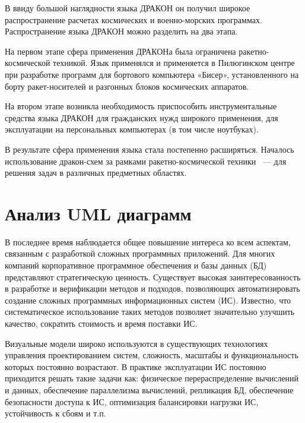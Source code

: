 В ввиду большой наглядности языка ДРАКОН он получил широкое распространение расчетах космических и военно-морских программах. Распространение языка ДРАКОН можно разделить на два этапа.

На первом этапе сфера применения ДРАКОНа была ограничена ракетно-космической техникой. Язык применялся и применяется в Пилюгинском центре при разработке программ для бортового компьютера «Бисер», установленного на борту ракет-носителей и разгонных блоков космических аппаратов.

На втором этапе возникла необходимость приспособить инструментальные средства языка ДРАКОН для гражданских нужд широкого применения, для эксплуатации на персональных компьютерах (в том числе ноутбуках).

В результате сфера применения языка стала постепенно расширяться. Началось использование дракон-схем за рамками ракетно-космической техники ~--- для решения задач в различных предметных областях.

\section{Анализ UML диаграмм}

В последнее время наблюдается общее повышение интереса ко всем аспектам, связанным с разработкой сложных программных приложений. Для многих компаний корпоративное программное обеспечения и базы данных (БД) представляют стратегическую ценность. Существует высокая заинтересованность в разработке и верификации методов и подходов, позволяющих автоматизировать создание сложных программных информационных систем (ИС). Известно, что систематическое использование таких методов позволяет значительно улучшить качество, сократить стоимость и время поставки ИС.

Визуальные модели широко используются в существующих технологиях управления проектированием систем, сложность, масштабы и функциональность которых постоянно возрастают. В практике эксплуатации ИС постоянно приходится решать такие задачи как: физическое перераспределение вычислений и данных, обеспечение параллелизма вычислений, репликация БД, обеспечение безопасности доступа к ИС, оптимизация балансировки нагрузки ИС, устойчивость к сбоям и т.п.

